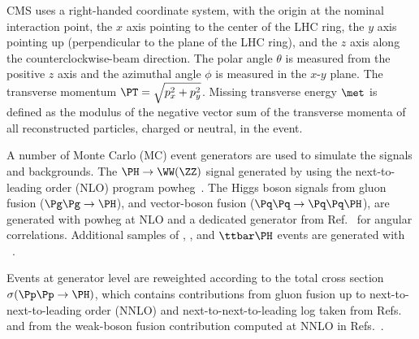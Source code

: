 CMS uses a right-handed coordinate system, with the
origin at the nominal interaction point, the $x$ axis
pointing to the center of the LHC ring, the $y$ axis pointing
up (perpendicular to the plane of the LHC ring), and the $z$ axis
along the counterclockwise-beam direction. The polar angle
$\theta$ is measured from the positive $z$ axis and the
azimuthal angle $\phi$ is measured in the $x$-$y$ plane.
The transverse
momentum $\PT = \sqrt{p_x^2 + p_y^2}$.
Missing transverse energy $\met$ is defined as the modulus of the negative vector sum of the
transverse momenta of all reconstructed particles, charged or neutral, in the event.

A number of Monte Carlo (MC) event generators are used to simulate the signals and
backgrounds. 
The $\PH \rightarrow \WW(\ZZ)$
signal 
generated by using the
next-to-leading order (NLO) program {\sc powheg}~\cite{POWHEG}.
The Higgs boson signals from gluon fusion ($\Pg\Pg \rightarrow \PH$),
and vector-boson fusion ($\Pq\Pq \rightarrow \Pq\Pq \PH$), are generated with
{\sc powheg} at NLO and a dedicated
generator from Ref.~\cite{Gao:2010qx} for angular correlations.
Additional samples of \PW\PH, \cPZ\PH, and $\ttbar\PH$ events are generated with
~\cite{Sjostrand:2006za}.

Events at generator level are reweighted according to the total cross section $\sigma(\Pp\Pp\rightarrow \PH)$,
which contains contributions from gluon fusion up to next-to-next-to-leading order (NNLO) and next-to-next-to-leading log taken from
Refs.~\cite{Anastasiou:2008tj,deFlorian:2009hc,Baglio:2010ae,LHCHiggsCrossSectionWorkingGroup:2011ti,Djouadi:1991tka,Dawson:1990zj,Spira:1995rr,Harlander:2002wh,Anastasiou:2002yz,Ravindran:2003um,Catani:2003zt,Actis:2008ug}
and from the  weak-boson fusion contribution computed at NNLO in
Refs.~\cite{LHCHiggsCrossSectionWorkingGroup:2011ti,Ciccolini:2007jr,Ciccolini:2007ec,Figy:2003nv,Arnold:2008rz,Bolzoni:2010xr}.



